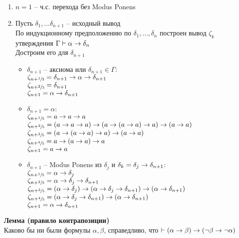 \documentclass[12pt]{article}
\begin{document}
\begin{enumerate}
    \item $n = 1$ -- ч.с. перехода без Modus Ponens
    \item Пусть $\delta_1, \ldots \delta_{n+1}$ -- исходный вывод\\
    По индукционному предположению по $\delta_1, \ldots, \delta_n$ построен вывод $\zeta_k$ утверждения $\Gamma\vdash \alpha\rightarrow \delta_n$\\
    Достроим его для $\delta_{n+1}$
    \begin{itemize}
        \item $\delta_{n+1}$ -- аксиома или $\delta_{n+1} \in \Gamma$:\\
        $\zeta_{n+\sfrac13} = \delta_{n+1} \rightarrow \alpha \rightarrow \delta_{n+1}$\\
        $\zeta_{n+\sfrac23} = \delta_{n+1}$\\
        $\zeta_{n + 1} = \alpha \rightarrow \delta_{n+1}$ 
        \item $\delta_{n+1} = \alpha$:\\
        $\zeta_{n+\sfrac15} = a \rightarrow a \rightarrow a$\\
        $\zeta_{n+\sfrac25} = (a \rightarrow a \rightarrow a) \rightarrow (a \rightarrow (a \rightarrow a) \rightarrow a) \rightarrow (a \rightarrow a)$\\
        $\zeta_{n+\sfrac35} = (a \rightarrow (a \rightarrow a) \rightarrow a) \rightarrow (a \rightarrow a)$\\
        $\zeta_{n+\sfrac45} = a \rightarrow (a \rightarrow a) \rightarrow a$\\
        $\zeta_{n+1} = a \rightarrow a$
        \item $\delta_{n+1}$ -- Modus Ponens из $\delta_j$ и $\delta_k = \delta_j \rightarrow \delta_{n+1}$:\\
        $\zeta_{n+\sfrac15} = \alpha\rightarrow \delta_j$\\
        $\zeta_{n+\sfrac25} = \alpha \rightarrow \delta_j \rightarrow \delta_{n+1}$\\
        $\zeta_{n+\sfrac35} = (\alpha \rightarrow \delta_j) \rightarrow (\alpha \rightarrow \delta_j \rightarrow \delta_{n+1}) \rightarrow (\alpha \rightarrow \delta_{n+1})$\\
        $\zeta_{n+\sfrac45} = (\alpha \rightarrow \delta_j \rightarrow \delta_{n+1}) \rightarrow (\alpha \rightarrow \delta_{n+1})$\\
        $\zeta_{n+1} = \alpha \rightarrow \delta_{n+1}$
    \end{itemize}
\end{enumerate}
\textbf{Лемма (правило контрапозиции)}\\
Каково бы ни были формулы $\alpha, \beta$, справедливо, что $\vdash (\alpha \rightarrow \beta) \rightarrow (\lnot \beta \rightarrow \lnot \alpha)$\\
\end{document}
